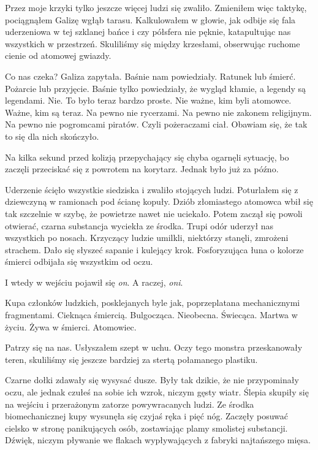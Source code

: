 Przez moje krzyki tylko jeszcze więcej ludzi się zwaliło.
Zmieniłem więc taktykę, pociągnąłem Galizę wgłąb tarasu.
Kalkulowałem w głowie, jak odbije się fala uderzeniowa w tej szklanej bańce i czy półsfera nie pęknie, katapultując nas wszystkich w przestrzeń.
Skuliliśmy się między krzesłami, obserwując ruchome cienie od atomowej gwiazdy.

\begin{dialogue}
	\ds{} Co nas czeka? \dm{} Galiza zapytała.
	\ds{} Baśnie nam powiedziały.
	\ds{} Ratunek lub śmierć. Pożarcie lub przyjęcie. \dm{} Baśnie tylko powiedziały, że wygląd kłamie, a legendy są legendami.
	\ds{} Nie. \dm{} To było teraz bardzo proste. \dm{} Nie ważne, kim byli atomowce. Ważne, kim są teraz. Na pewno nie rycerzami. Na pewno nie zakonem religijnym. Na pewno nie pogromcami piratów.
	\ds{} Czyli pożeraczami ciał.
	\ds{} Obawiam się, że tak to się dla nich skończyło.
\end{dialogue}

Na kilka sekund przed kolizją przepychający się chyba ogarnęli sytuację, bo zaczęli przeciskać się z powrotem na korytarz.
Jednak było już za późno.

Uderzenie ścięło wszystkie siedziska i zwaliło stojących ludzi.
Poturlałem się z dziewczyną w ramionach pod ścianę kopuły.
Dziób złomiastego atomowca wbił się tak szczelnie w szybę, że powietrze nawet nie uciekało.
Potem zaczął się powoli otwierać, czarna substancja wyciekła ze środka.
Trupi odór uderzył nas wszystkich po nosach.
Krzyczący ludzie umilkli, niektórzy stanęli, zmrożeni strachem.
Dało się słyszeć sapanie i kulejący krok.
Fosforyzująca łuna o kolorze śmierci odbijała się wszystkim od oczu.

I wtedy w wejściu pojawił się \emph{on}.
A raczej, \emph{oni}.

Kupa członków ludzkich, posklejanych byle jak, poprzeplatana mechanicznymi fragmentami.
Cieknąca śmiercią.
Bulgocząca.
Nieobecna.
Świecąca.
Martwa w życiu.
Żywa w śmierci.
Atomowiec.

\begin{dialogue}
	\ds{} Patrzy się na nas. \dm{} Usłyszałem szept w uchu. Oczy tego monstra przeskanowały teren, skuliliśmy się jeszcze bardziej za stertą połamanego plastiku.
\end{dialogue}

Czarne dołki zdawały się wysysać dusze.
Były tak dzikie, że nie przypominały oczu, ale jednak czułeś na sobie ich wzrok, niczym gęsty wiatr.
Ślepia skupiły się na wejściu i przerażonym zatorze powywracanych ludzi.
Ze środka biomechanicznej kupy wysunęła się czyjaś ręka i pięć nóg.
Zaczęły posuwać cielsko w stronę panikujących osób, zostawiając plamy smolistej substancji.
Dźwięk, niczym pływanie we flakach wypływających z fabryki najtańszego mięsa.

